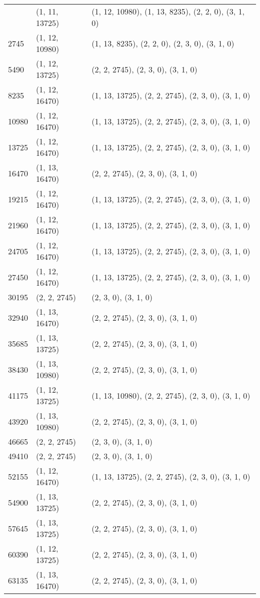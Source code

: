 \begin{enumerate}
\begin{center}
\begin{longtable}{|l|l|l|}
\hline \hline
\endlastfoot
0 & (1, 11, 13725) & (1, 12, 10980), (1, 13, 8235), (2, 2, 0), (3, 1, 0) \\
2745 & (1, 12, 10980) & (1, 13, 8235), (2, 2, 0), (2, 3, 0), (3, 1, 0) \\
5490 & (1, 12, 13725) & (2, 2, 2745), (2, 3, 0), (3, 1, 0) \\
8235 & (1, 12, 16470) & (1, 13, 13725), (2, 2, 2745), (2, 3, 0), (3, 1, 0) \\
10980 & (1, 12, 16470) & (1, 13, 13725), (2, 2, 2745), (2, 3, 0), (3, 1, 0) \\
13725 & (1, 12, 16470) & (1, 13, 13725), (2, 2, 2745), (2, 3, 0), (3, 1, 0) \\
16470 & (1, 13, 16470) & (2, 2, 2745), (2, 3, 0), (3, 1, 0) \\
19215 & (1, 12, 16470) & (1, 13, 13725), (2, 2, 2745), (2, 3, 0), (3, 1, 0) \\
21960 & (1, 12, 16470) & (1, 13, 13725), (2, 2, 2745), (2, 3, 0), (3, 1, 0) \\
24705 & (1, 12, 16470) & (1, 13, 13725), (2, 2, 2745), (2, 3, 0), (3, 1, 0) \\
27450 & (1, 12, 16470) & (1, 13, 13725), (2, 2, 2745), (2, 3, 0), (3, 1, 0) \\
30195 & (2, 2, 2745) & (2, 3, 0), (3, 1, 0) \\
32940 & (1, 13, 16470) & (2, 2, 2745), (2, 3, 0), (3, 1, 0) \\
35685 & (1, 13, 13725) & (2, 2, 2745), (2, 3, 0), (3, 1, 0) \\
38430 & (1, 13, 10980) & (2, 2, 2745), (2, 3, 0), (3, 1, 0) \\
41175 & (1, 12, 13725) & (1, 13, 10980), (2, 2, 2745), (2, 3, 0), (3, 1, 0) \\
43920 & (1, 13, 10980) & (2, 2, 2745), (2, 3, 0), (3, 1, 0) \\
46665 & (2, 2, 2745) & (2, 3, 0), (3, 1, 0) \\
49410 & (2, 2, 2745) & (2, 3, 0), (3, 1, 0) \\
52155 & (1, 12, 16470) & (1, 13, 13725), (2, 2, 2745), (2, 3, 0), (3, 1, 0) \\
54900 & (1, 13, 13725) & (2, 2, 2745), (2, 3, 0), (3, 1, 0) \\
57645 & (1, 13, 13725) & (2, 2, 2745), (2, 3, 0), (3, 1, 0) \\
60390 & (1, 12, 13725) & (2, 2, 2745), (2, 3, 0), (3, 1, 0) \\
63135 & (1, 13, 16470) & (2, 2, 2745), (2, 3, 0), (3, 1, 0) \\

\end{longtable}
\end{center}
\end{enumerate}
